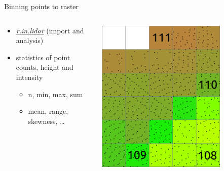\documentclass[xcolor={dvipsnames,usenames},beamer,aspectratio=169]{beamer}
\newcommand{\gmodule}[1]{\href{http://grass.osgeo.org/grass71/manuals/#1.html}{\emph{#1}}}
\begin{document}
\begin{frame}{Binning points to raster}

\begin{columns}
\begin{column}{0.4\textwidth}

 \begin{itemize}
  \item \gmodule{r.in.lidar} (import and analysis)
  \item statistics of point counts, height and intensity
  \begin{itemize}
    \item n, min, max, sum
    \item mean, range, skewness, \ldots
  \end{itemize}
\end{itemize}

\end{column}
\begin{column}{0.45\textwidth}

\begin{center}
  \includegraphics[width=0.75\textwidth]{features/binning_mean}
\end{center}

\end{column}
\end{columns}

\end{frame}
\end{document}
